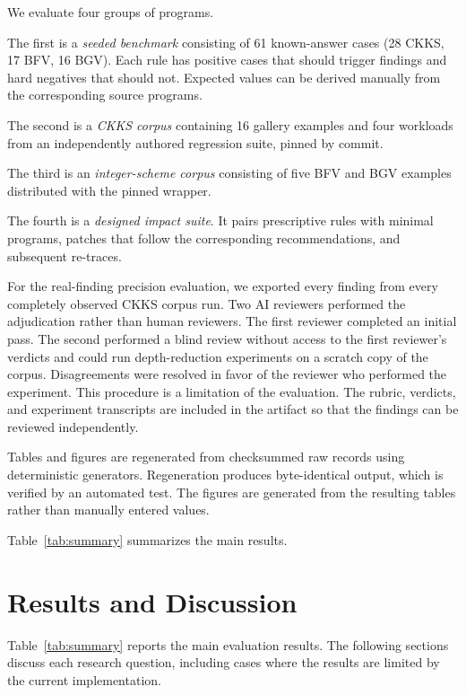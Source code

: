 \documentclass[sigconf,nonacm]{acmart}
\begin{document}
We evaluate four groups of programs.

The first is a \emph{seeded benchmark} consisting of 61 known-answer cases
(28 CKKS, 17 BFV, 16 BGV). Each rule has positive cases that should trigger
findings and hard negatives that should not. Expected values can be derived
manually from the corresponding source programs.

The second is a \emph{CKKS corpus} containing 16 gallery examples and four
workloads from an independently authored regression suite, pinned by commit.

The third is an \emph{integer-scheme corpus} consisting of five BFV and BGV
examples distributed with the pinned wrapper.

The fourth is a \emph{designed impact suite}. It pairs prescriptive rules with
minimal programs, patches that follow the corresponding recommendations, and
subsequent re-traces.

For the real-finding precision evaluation, we exported every finding from
every completely observed CKKS corpus run. Two AI reviewers performed the
adjudication rather than human reviewers. The first reviewer completed an
initial pass. The second performed a blind review without access to the first
reviewer's verdicts and could run depth-reduction experiments on a scratch
copy of the corpus. Disagreements were resolved in favor of the reviewer who
performed the experiment. This procedure is a limitation of the evaluation.
The rubric, verdicts, and experiment transcripts are included in the artifact
so that the findings can be reviewed independently.

Tables and figures are regenerated from checksummed raw records using
deterministic generators. Regeneration produces byte-identical output, which
is verified by an automated test. The figures are generated from the
resulting tables rather than manually entered values.

Table~\ref{tab:summary} summarizes the main results.

\section{Results and Discussion}
\label{sec:results}

Table~\ref{tab:summary} reports the main evaluation results. The following
sections discuss each research question, including cases where the results
are limited by the current implementation.
\end{document}
